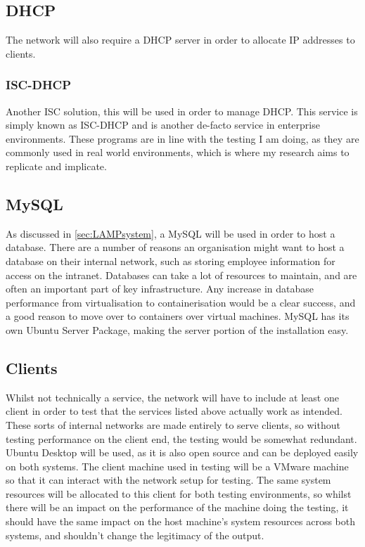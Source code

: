 \subsection{DHCP}
\label{DHCP Spec}
The network will also require a DHCP server in order to allocate IP addresses to clients.

\subsubsection{ISC-DHCP}
Another ISC solution\citep{ISCtimeline}, this will be used in order to manage DHCP. This service is simply known as ISC-DHCP and is another de-facto service in enterprise environments. These programs are in line with the testing I am doing, as they are commonly used in real world environments, which is where my research aims to replicate and implicate.

\subsection{MySQL}
\label{MySQL Server}
As discussed in \ref{sec:LAMPsystem}, a MySQL will be used in order to host a database. There are a number of reasons an organisation might want to host a database on their internal network, such as storing employee information for access on the intranet. Databases can take a lot of resources to maintain, and are often an important part of key infrastructure. Any increase in database performance from virtualisation to containerisation would be a clear success, and a good reason to move over to containers over virtual machines. MySQL has its own Ubuntu Server Package, making the server portion of the installation easy.

\subsection{Clients}
Whilst not technically a service, the network will have to include at least one client in order to test that the services listed above actually work as intended. These sorts of internal networks are made entirely to serve clients, so without testing performance on the client end, the testing would be somewhat redundant. Ubuntu Desktop will be used, as it is also open source and can be deployed easily on both systems. The client machine used in testing will be a VMware machine so that it can interact with the network setup for testing. The same system resources will be allocated to this client for both testing environments, so whilst there will be an impact on the performance of the machine doing the testing, it should have the same impact on the host machine's system resources across both systems, and shouldn't change the legitimacy of the output.

